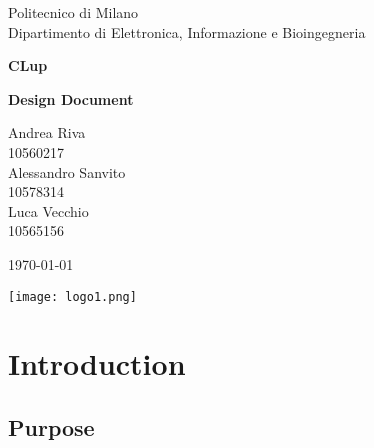 \documentclass[10pt,english, openany]{book}
\begin{document}

\begin{titlepage}
	\clearpage\thispagestyle{empty}
	\centering
	\vspace{1cm}

	{\normalsize Politecnico di Milano\\
	             Dipartimento di Elettronica, Informazione e Bioingegneria \par}
		\vspace{2cm}
	{\Huge \textbf{CLup}
	} \\
	{\large \textbf{Design Document} \par}
	\vspace{4cm}
	{\normalsize Andrea Riva\\
	             10560217\\
	             Alessandro Sanvito\\ 
                 10578314\\
                 Luca Vecchio\\
                 10565156
                 \par}
	\vspace{5cm}
	
	{\normalsize \today \par}
	
	\vspace{0.5cm}
    
    \centering \texttt{[image: logo1.png]}
    
    
	\pagebreak

\end{titlepage}

\tableofcontents{}

\mainmatter

\chapter{Introduction}\label{chapt:sum}

\section{Purpose}
\end{document}
